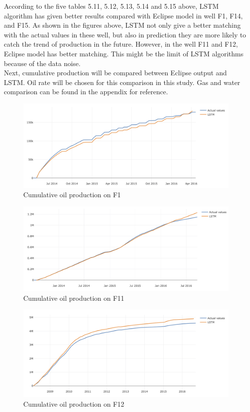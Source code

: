 \documentclass[12pt,a4paper]{report}
\begin{document}
According to the five tables 5.11, 5.12, 5.13, 5.14 and 5.15 above, LSTM algorithm has given better results compared with Eclipse model in well F1, F14, and F15. As shown in the figures above, LSTM not only give a better matching with the actual values in these well, but also in prediction they are more likely to catch the trend of production in the future. However, in the well F11 and F12, Eclipse model has better matching. This might be the limit of LSTM algorithms because of the data noise.\\
Next, cumulative production will be compared between Eclipse output and LSTM. Oil rate will be chosen for this comparison in this study. Gas and water comparison can be found in the appendix for reference.

\begin{figure}[H]
  \centering
  \includegraphics[width=\linewidth]{Cumulative/F1}
  \caption{Cumulative oil production on F1}
\end{figure}

\begin{figure}[H]
  \centering
  \includegraphics[width=\linewidth]{Cumulative/F11}
  \caption{Cumulative oil production on F11}
\end{figure}

\begin{figure}[H]
  \centering
  \includegraphics[width=\linewidth]{Cumulative/F12}
  \caption{Cumulative oil production on F12}
\end{figure}
\end{document}

